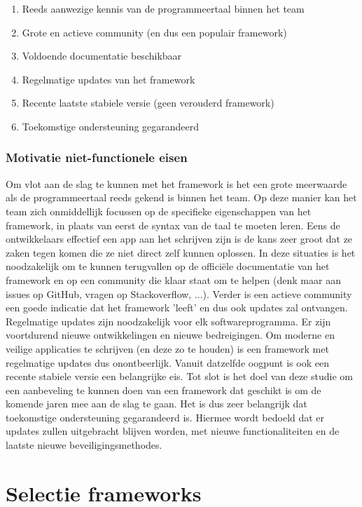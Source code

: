 \begin{enumerate}
    \item Reeds aanwezige kennis van de programmeertaal binnen het team
    \item Grote en actieve community (en dus een populair framework)
    \item Voldoende documentatie beschikbaar
    \item Regelmatige updates van het framework
    \item Recente laatste stabiele versie (geen verouderd framework)
    \item Toekomstige ondersteuning gegarandeerd    
\end{enumerate}

\subsubsection{Motivatie niet-functionele eisen}
\label{subsubsec:MotivatieNietFuntioneleEisen}

Om vlot aan de slag te kunnen met het framework is het een grote meerwaarde als de programmeertaal reeds gekend is binnen het team. Op deze manier kan het team zich onmiddellijk focussen op de specifieke eigenschappen van het framework, in plaats van eerst de syntax van de taal te moeten leren. Eens de ontwikkelaars effectief een app aan het schrijven zijn is de kans zeer groot dat ze zaken tegen komen die ze niet direct zelf kunnen oplossen. In deze situaties is het noodzakelijk om te kunnen terugvallen op de officiële documentatie van het framework en op een community die klaar staat om te helpen (denk maar aan issues op GitHub, vragen op Stackoverflow, ...). Verder is een actieve community een goede indicatie dat het framework 'leeft' en dus ook updates zal ontvangen. Regelmatige updates zijn noodzakelijk voor elk softwareprogramma. Er zijn voortdurend nieuwe ontwikkelingen en nieuwe bedreigingen. Om moderne en veilige applicaties te schrijven (en deze zo te houden) is een framework met regelmatige updates dus onontbeerlijk. Vanuit datzelfde oogpunt is ook een recente stabiele versie een belangrijke eis. Tot slot is het doel van deze studie om een aanbeveling te kunnen doen van een framework dat geschikt is om de komende jaren mee aan de slag te gaan. Het is dus zeer belangrijk dat toekomstige ondersteuning gegarandeerd is. Hiermee wordt bedoeld dat er updates zullen uitgebracht blijven worden, met nieuwe functionaliteiten en de laatste nieuwe beveiligingsmethodes.

\section{Selectie frameworks}
\label{sec:selectieFrameworks}

